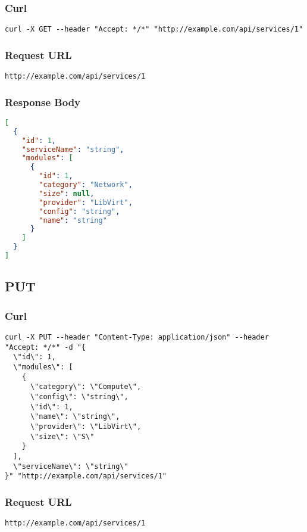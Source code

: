 \subsubsection{Curl}
\begin{lstlisting}[style=Bash] 
curl -X GET --header "Accept: */*" "http://example.com/api/services/1"
\end{lstlisting}
\subsubsection{Request URL}
\begin{lstlisting}[] 
http://example.com/api/services/1
\end{lstlisting}

\subsubsection{Response Body}
\begin{lstlisting}[language=json] 
[
  {
    "id": 1,
    "serviceName": "string",
    "modules": [
      {
        "id": 1,
        "category": "Network",
        "size": null,
        "provider": "LibVirt",
        "config": "string",
        "name": "string"
      }
    ]
  }
]
\end{lstlisting}



\subsection{PUT}
\subsubsection{Curl}
\begin{lstlisting}[style=Bash] 
curl -X PUT --header "Content-Type: application/json" --header "Accept: */*" -d "{
  \"id\": 1,
  \"modules\": [
    {
      \"category\": \"Compute\",
      \"config\": \"string\",
      \"id\": 1,
      \"name\": \"string\",
      \"provider\": \"LibVirt\",
      \"size\": \"S\"
    }
  ],
  \"serviceName\": \"string\"
}" "http://example.com/api/services/1"
\end{lstlisting}

\subsubsection{Request URL}
\begin{lstlisting}[] 
http://example.com/api/services/1
\end{lstlisting}


